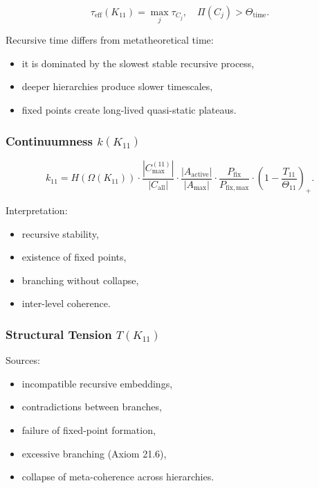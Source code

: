 \[
\tau_{\mathrm{eff}}(K_{11})
=
\max_j \tau_{C_j},
\quad
\Pi(C_j)>\Theta_{\mathrm{time}}.
\]

Recursive time differs from metatheoretical time:
\begin{itemize}
    \item it is dominated by the slowest stable recursive process,
    \item deeper hierarchies produce slower timescales,
    \item fixed points create long-lived quasi-static plateaus.
\end{itemize}

\subsubsection{Continuumness $k(K_{11})$}

\[
k_{11}=
H(\Omega(K_{11}))
\cdot
\frac{|C_{\max}^{(11)}|}{|C_{\mathrm{all}}|}
\cdot
\frac{|A_{\mathrm{active}}|}{|A_{\max}|}
\cdot
\frac{P_{\mathrm{fix}}}{P_{\mathrm{fix,max}}}
\cdot
\left(1-\frac{T_{11}}{\Theta_{11}}\right)_+.
\]

Interpretation:
\begin{itemize}
    \item recursive stability,
    \item existence of fixed points,
    \item branching without collapse,
    \item inter-level coherence.
\end{itemize}

\subsubsection{Structural Tension $T(K_{11})$}

Sources:
\begin{itemize}
    \item incompatible recursive embeddings,
    \item contradictions between branches,
    \item failure of fixed-point formation,
    \item excessive branching (Axiom 21.6),
    \item collapse of meta-coherence across hierarchies.
\end{itemize}

